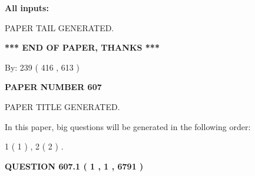 \documentclass[12pt]{article}
\begin{document}
   
   
   
\noindent{}
   
   
   
   
\noindent\vspace{0.1in}\hspace{-0.08in} {\textbf{\Large{All inputs: }}}
   
   
   
   
   
   
 \vspace{0.2in}
 
   
   
\vspace{2.0in} PAPER TAIL GENERATED.
   
   
   
   
\vspace{1.0in} 
{\textbf{\large{ *** END OF PAPER, THANKS *** }}} 
   
   
\hspace{1.0in} By: 
 239 ( 416 ,  613 )
   
   
   
   
\newpage 
\setcounter{page}{ 
   607001 } 
   
   
   
   
 {\textbf{ \Large{ PAPER NUMBER  607  }}}
   
   
\vspace{0.2in}
   
   
   
   
   
   
   
   
 \vspace{0.2in}
 
 
 
 
   
   
 PAPER TITLE GENERATED.
   
   
   
\vspace{0.2in}
   
In this paper, big questions will be generated in the following order: 
   
   
   1 ( 1 )
 ,
   2 ( 2 )
 .
  
\vspace{0.2in}
  
{\textbf{\Large{QUESTION
607.1 
 ( 1 , 1 , 6791 )
}}}
  
\end{document}
